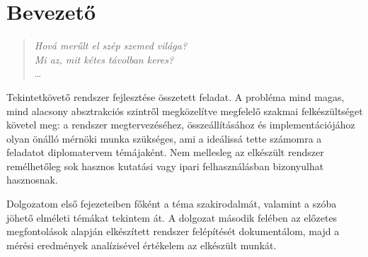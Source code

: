 \chapter*{Bevezető}

\begin{verse}
\begin{flushright}
\emph{Hová merűlt el szép szemed világa? \\
Mi az, mit kétes távolban keres?} \\
\dots
\end{flushright}
\end{verse}

Tekintetkövető rendszer fejlesztése összetett feladat. A probléma mind magas, mind alacsony absztrakciós szintről megközelítve megfelelő szakmai felkészültséget követel meg: a rendszer megtervezéséhez, összeállításához és implementációjához olyan önálló mérnöki munka szükséges, ami a ideálissá tette számomra a feladatot diplomatervem témájaként. Nem mellesleg az elkészült rendszer remélhetőleg sok hasznos kutatási vagy ipari felhasználásban bizonyulhat hasznosnak.

\bigskip

Dolgozatom első fejezeteiben főként a téma szakirodalmát, valamint a szóba jöhető elméleti témákat tekintem át. A dolgozat második felében az előzetes megfontolások alapján elkészített rendszer felépítését dokumentálom, majd a mérési eredmények analízisével értékelem az elkészült munkát.